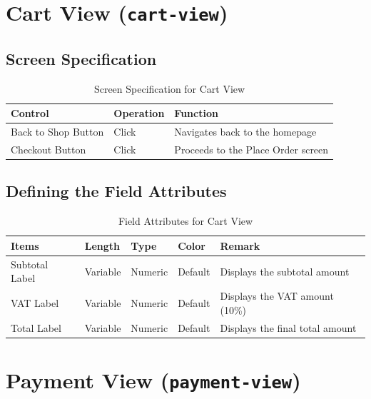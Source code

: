 \documentclass{article}
\begin{document}
\section{Cart View (\texttt{cart-view})}
\subsection{Screen Specification}
\begin{table}[h!]
\centering
\begin{tabularx}{\textwidth}{|l|l|X|}
\hline
\textbf{Control} & \textbf{Operation} & \textbf{Function} \\
\hline
Back to Shop Button & Click & Navigates back to the homepage \\
\hline
Checkout Button & Click & Proceeds to the Place Order screen \\
\hline
\end{tabularx}
\caption{Screen Specification for Cart View}
\end{table}

\subsection{Defining the Field Attributes}
\begin{table}[h!]
\centering
\begin{tabularx}{\textwidth}{|l|l|l|l|X|}
\hline
\textbf{Items} & \textbf{Length} & \textbf{Type} & \textbf{Color} & \textbf{Remark} \\
\hline
Subtotal Label & Variable & Numeric & Default & Displays the subtotal amount \\
\hline
VAT Label & Variable & Numeric & Default & Displays the VAT amount (10\%) \\
\hline
Total Label & Variable & Numeric & Default & Displays the final total amount \\
\hline
\end{tabularx}
\caption{Field Attributes for Cart View}
\end{table}

\section{Payment View (\texttt{payment-view})}
\end{document}
